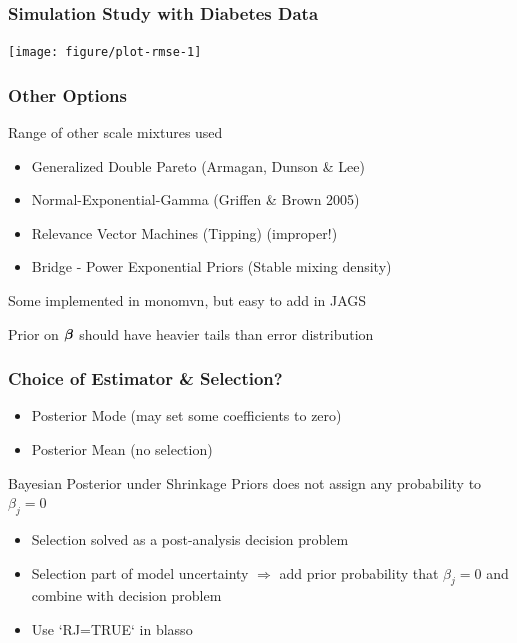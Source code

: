 \documentclass{beamer}\usepackage[]{graphicx}\usepackage[]{color}
\newenvironment{knitrout}{}{} %
\begin{document}
\begin{frame}[fragile]  \frametitle{Simulation Study with Diabetes Data}


\begin{knitrout}
\color{fgcolor}

{\centering \texttt{[image: figure/plot-rmse-1]} 

}



\end{knitrout}

\end{frame}




\begin{frame}
  \frametitle{Other Options}
  Range of other scale mixtures used  \pause
  \begin{itemize}
  \item Generalized Double Pareto (Armagan, Dunson \& Lee)
 \pause
  \item Normal-Exponential-Gamma (Griffen \& Brown 2005)

  \pause

\item Relevance Vector Machines (Tipping) (improper!) \pause
  \item Bridge - Power Exponential Priors  (Stable mixing density) \pause

   \end{itemize}
Some implemented in monomvn, but easy to add in JAGS  \pause

\vfill

Prior on $\boldsymbol{\beta}$ should have heavier tails than error distribution
\end{frame}

\begin{frame}
  \frametitle{Choice of Estimator \& Selection?}

  \begin{itemize}
  \item Posterior Mode (may set some coefficients to zero) \pause
  \item Posterior Mean (no selection) \pause
  \end{itemize}
  Bayesian Posterior under Shrinkage Priors does not assign any probability to $\beta_j = 0$ \pause

  \begin{itemize}
  \item Selection solved as a post-analysis decision problem \pause
  \item Selection part of model uncertainty $\Rightarrow$ add prior \pause
    probability that $\beta_j = 0$  and combine with decision problem  \pause
    \item Use `RJ=TRUE` in blasso


  \end{itemize}
\end{frame}
\end{document}
